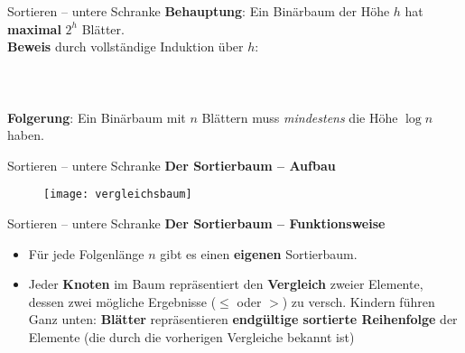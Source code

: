 \begin{frame}{Sortieren – untere Schranke}
	\textbf{Behauptung}: Ein Binärbaum der Höhe $h$ hat \textbf{maximal} $2^h$  Blätter. \\
	\pause
	\textbf{Beweis} durch vollständige Induktion über $h$: \\
	\pause
	 \\
	\pause
	 \\
	\pause
	 \\
	\pause
	\impl \textbf{Folgerung}: Ein Binärbaum mit $n$ Blättern muss \textit{mindestens} die Höhe $\log n$ haben.
\end{frame}

\begin{frame}{Sortieren – untere Schranke}
	\textbf{Der Sortierbaum -- Aufbau}
	\begin{figure}[htp]
		\centering
		\texttt{[image: vergleichsbaum]}
	\end{figure}
\end{frame}

\begin{frame}{Sortieren – untere Schranke}
	\textbf{Der Sortierbaum -- Funktionsweise}
	\pause
	\begin{itemize}
		\item Für jede Folgenlänge $n$ gibt es einen \textbf{eigenen} Sortierbaum.
		\pause
		\item Jeder \textbf{Knoten} im Baum repräsentiert den \textbf{Vergleich} zweier Elemente, dessen zwei mögliche Ergebnisse ($\leq$ oder $>$) zu versch. Kindern führen
		\pause
		\implitem Ganz unten: \textbf{Blätter} repräsentieren \textbf{endgültige sortierte Reihenfolge} der Elemente (die durch die vorherigen Vergleiche bekannt ist)
	\end{itemize}
\end{frame}


